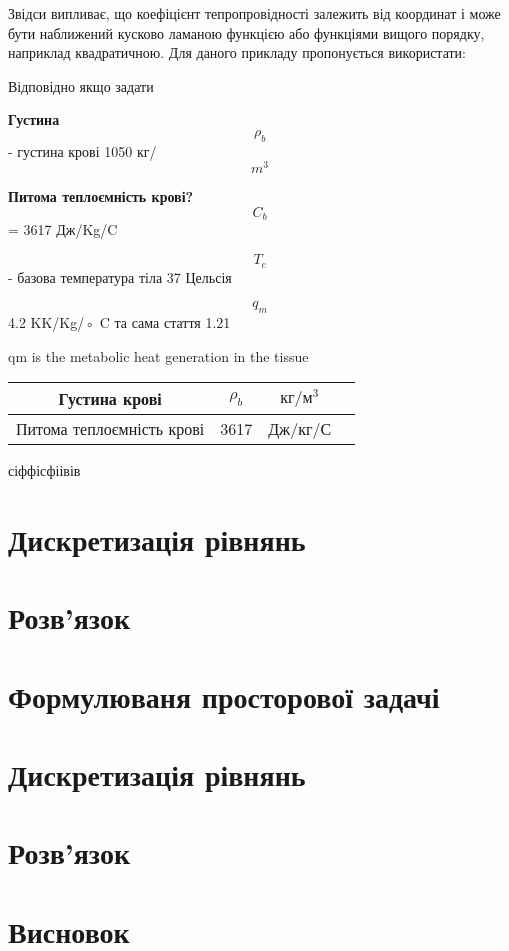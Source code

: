 Звідси випливає, що коефіцієнт тепропровідності залежить від координат і може бути наближений кусково ламаною функцією 
або функціями вищого порядку, наприклад квадратичною. Для даного прикладу пропонується використати:



Відповідно якщо задати 

\textbf{Густина} $$\rho_b$$ - густина крові 1050 кг/$$m^3$$ %

\textbf{Питома теплоємність крові?} $$C_b$$ = 3617 Дж/Kg/C %

$$T_c$$ - базова температура тіла 37 Цельсія

$$q_m$$ 4.2 KK/Kg/◦ C та сама стаття  1.21

qm is the metabolic heat generation in the tissue

\begin{center}
    \begin{tabular}{|c|c|c|c|} 
     \hline
     Густина крові & \(\rho_b\) & \(\text{кг}/\text{м}^3\) \\ 
     \hline
     Питома теплоємність крові & 3617 & Дж/кг/С \\ 
     \hline
    \end{tabular}
\end{center}

сіффісфіівів

\section{Дискретизація рівнянь}

\section{Розв'язок}

\section{Формулюваня просторової задачі}

\section{Дискретизація рівнянь}

\section{Розв'язок}

\section{Висновок}
